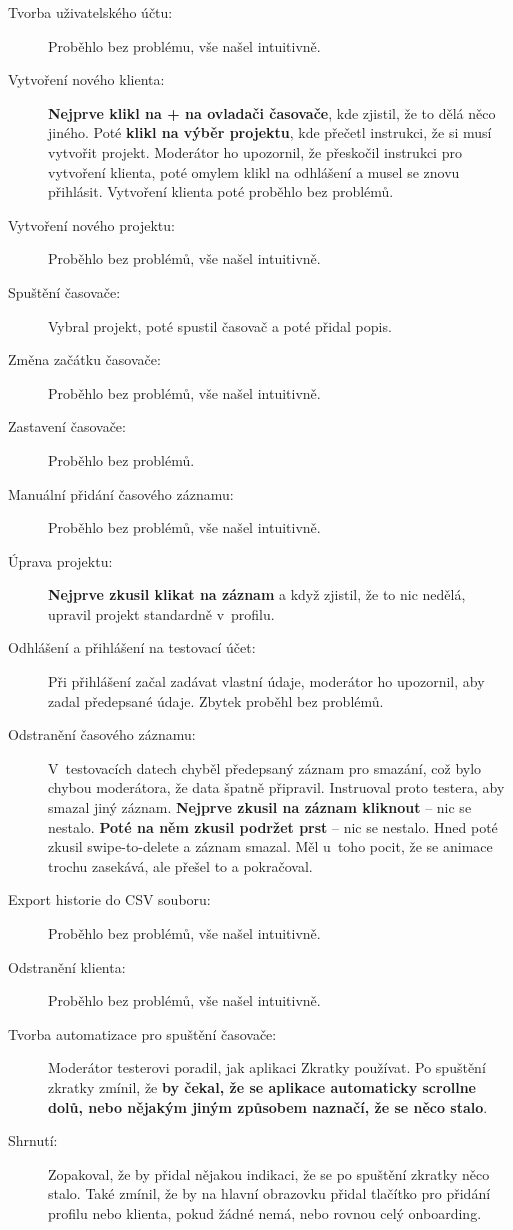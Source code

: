 \begin{description}
\item[Tvorba uživatelského účtu:] Proběhlo bez problému, vše našel intuitivně.
\item[Vytvoření nového klienta:] \textbf{Nejprve klikl na + na ovladači časovače}, kde zjistil, že to dělá něco jiného. Poté \textbf{klikl na výběr projektu}, kde přečetl instrukci, že si musí vytvořit projekt. Moderátor ho upozornil, že přeskočil instrukci pro vytvoření klienta, poté omylem klikl na odhlášení a musel se znovu přihlásit. Vytvoření klienta poté proběhlo bez problémů.
\item[Vytvoření nového projektu:] Proběhlo bez problémů, vše našel intuitivně.
\item[Spuštění časovače:] Vybral projekt, poté spustil časovač a poté přidal popis.
\item[Změna začátku časovače:] Proběhlo bez problémů, vše našel intuitivně.
\item[Zastavení časovače:] Proběhlo bez problémů.
\item[Manuální přidání časového záznamu:] Proběhlo bez problémů, vše našel intuitivně.
\item[Úprava projektu:] \textbf{Nejprve zkusil klikat na záznam} a když zjistil, že to nic nedělá, upravil projekt standardně v~profilu.
\item[Odhlášení a přihlášení na testovací účet:] Při přihlášení začal zadávat vlastní údaje, moderátor ho upozornil, aby zadal předepsané údaje. Zbytek proběhl bez problémů.
\item[Odstranění časového záznamu:] V~testovacích datech chyběl předepsaný záznam pro smazání, což bylo chybou moderátora, že data špatně připravil. Instruoval proto testera, aby smazal jiný záznam. \textbf{Nejprve zkusil na záznam kliknout} – nic se nestalo. \textbf{Poté na něm zkusil podržet prst} – nic se nestalo. Hned poté zkusil swipe-to-delete a záznam smazal. Měl u~toho pocit, že se animace trochu zasekává, ale přešel to a pokračoval.
\item[Export historie do CSV souboru:] Proběhlo bez problémů, vše našel intuitivně.
\item[Odstranění klienta:] Proběhlo bez problémů, vše našel intuitivně.
\item[Tvorba automatizace pro spuštění časovače:] Moderátor testerovi poradil, jak aplikaci Zkratky používat. Po spuštění zkratky zmínil, že \textbf{by čekal, že se aplikace automaticky scrollne dolů, nebo nějakým jiným způsobem naznačí, že se něco stalo}.
\item[Shrnutí:] Zopakoval, že by přidal nějakou indikaci, že se po spuštění zkratky něco stalo. Také zmínil, že by na hlavní obrazovku přidal tlačítko pro přidání profilu nebo klienta, pokud žádné nemá, nebo rovnou celý onboarding.
\end{description}




